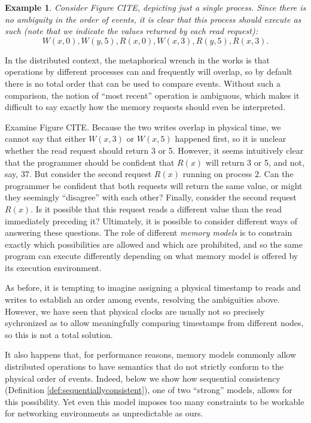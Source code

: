 \documentclass[]             %
{NASA}                       %
\newtheorem{example}{Example}
\theoremstyle{definition}
\begin{document}
\begin{example}
Consider Figure CITE, depicting just a single process. Since there is
no ambiguity in the order of events, it is clear that this process
should execute as such (note that we indicate the values returned by
each read request):
\[ W(x, 0), W(y, 5), R(x, 0), W(x, 3), R(y, 5), R(x, 3). \]
\end{example}

In the distributed context, the metaphorical wrench in the works is
that operations by different processes can and frequently will
overlap, so by default there is no total order that can be used to
compare events. Without such a comparison, the notion of ``most
recent'' operation is ambiguous, which makes it difficult to say
exactly how the memory requests should even be interpreted.

Examine Figure CITE. Because the two writes overlap in physical time,
we cannot say that either $W(x,3)$ or $W(x,5)$ happened first, so it
is unclear whether the read request should return 3 or 5. However, it
seems intuitively clear that the programmer should be confident that
$R(x)$ will return 3 or 5, and not, say, 37. But consider the second
request $R(x)$ running on process $2$. Can the programmer be confident
that both requests will return the same value, or might they seemingly
``disagree'' with each other? Finally, consider the second request
$R(x)$. Is it possible that this request reads a different value than
the read immediately preceding it?  Ultimately, it is possible to
consider different ways of answering these questions. The role of
different \emph{memory models} is to constrain exactly which
possibilities are allowed and which are prohibited, and so the same
program can execute differently depending on what memory model is
offered by its execution environment.

As before, it is tempting to imagine assigning a physical timestamp to
reads and writes to establish an order among events, resolving the
ambiguities above. However, we have seen that physical clocks are
usually not so precisely sychronized as to allow meaningfully
comparing timestamps from different nodes, so this is not a total
solution.

It also happens that, for performance reasons, memory models commonly
allow distributed operations to have semantics that do not strictly
conform to the physical order of events. Indeed, below we show how
sequential consistency (Definition \ref{def:sequentiallyconsistent}),
one of two ``strong'' models, allows for this possibility. Yet even
this model imposes too many constraints to be workable for networking
environments as unpredictable as ours.
\end{document}
